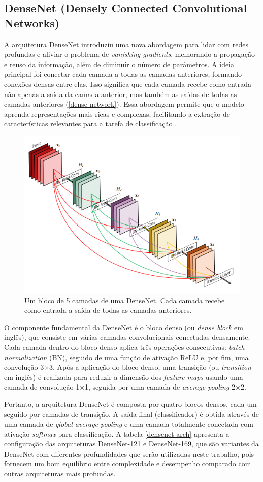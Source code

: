 \subsection{DenseNet (Densely Connected Convolutional Networks)}

A arquitetura DenseNet introduziu uma nova abordagem para lidar com redes profundas e aliviar o problema de \textit{vanishing gradients}, melhorando a propagação e reuso da informação, além de diminuir o número de parâmetros. A ideia principal foi conectar cada camada a todas as camadas anteriores, formando conexões densas entre elas. Isso significa que cada camada recebe como entrada não apenas a saída da camada anterior, mas também as saídas de todas as camadas anteriores (\autoref{dense-network}). Essa abordagem permite que o modelo aprenda representações mais ricas e complexas, facilitando a extração de características relevantes para a tarefa de classificação \citep{Huang2017}.

\begin{figure}[h]
    \centering
    \includegraphics[width=0.5\linewidth]{figs/dense-network.png}
    \caption{Um bloco de 5 camadas de uma DenseNet. Cada camada recebe como entrada a saída de todas as camadas anteriores.}
    \label{dense-network}
\end{figure}

O componente fundamental da DenseNet é o bloco denso (ou \textit{dense block} em inglês), que consiste em várias camadas convolucionais conectadas densamente. Cada camada dentro do bloco denso aplica três operações consecutivas: \textit{batch normalization} (BN), seguido de uma função de ativação ReLU e, por fim, uma convolução 3×3. Após a aplicação do bloco denso, uma transição (ou \textit{transition} em inglês) é realizada para reduzir a dimensão dos \textit{feature maps} usando uma camada de convolução 1×1, seguida por uma camada de \textit{average pooling} 2×2.

Portanto, a arquitetura DenseNet é composta por quatro blocos densos, cada um seguido por camadas de transição. A saída final (classificador) é obtida através de uma camada de \textit{global average pooling} e uma camada totalmente conectada com ativação \textit{softmax} para classificação. A tabela \ref{densenet-arch} apresenta a configuração das arquiteturas DenseNet-121 e DenseNet-169, que são variantes da DenseNet com diferentes profundidades que serão utilizadas neste trabalho, pois fornecem um bom equilíbrio entre complexidade e desempenho comparado com outras arquiteturas mais profundas.

